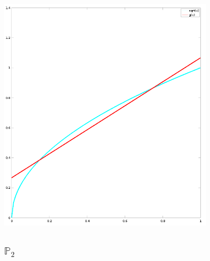 \documentclass[10pt,a4paper]{article}
\begin{document}
\includegraphics[width=300pt]{6_17_p1.png}

\subsection{$\mathbb{P}_{2}$}
\end{document}
